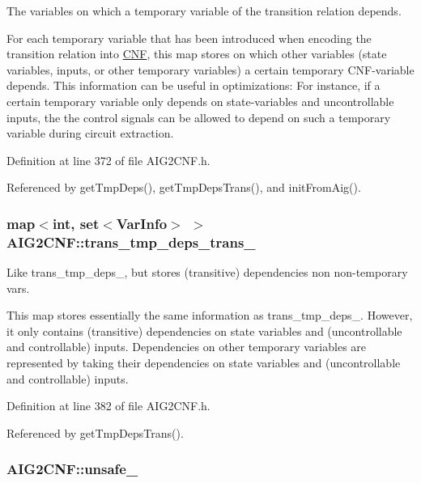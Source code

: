 The variables on which a temporary variable of the transition relation depends. 

For each temporary variable that has been introduced when encoding the transition relation into \hyperlink{classCNF}{C\-N\-F}, this map stores on which other variables (state variables, inputs, or other temporary variables) a certain temporary C\-N\-F-\/variable depends. This information can be useful in optimizations\-: For instance, if a certain temporary variable only depends on state-\/variables and uncontrollable inputs, the the control signals can be allowed to depend on such a temporary variable during circuit extraction. 

Definition at line 372 of file A\-I\-G2\-C\-N\-F.\-h.



Referenced by get\-Tmp\-Deps(), get\-Tmp\-Deps\-Trans(), and init\-From\-Aig().

\hypertarget{classAIG2CNF_a7e3c2e9acc3357e837349e30447b93c3}{
\subsubsection[{trans\-\_\-tmp\-\_\-deps\-\_\-trans\-\_\-}]{\setlength{\rightskip}{0pt plus 5cm}map$<$int, set$<${\bf Var\-Info}$>$ $>$ A\-I\-G2\-C\-N\-F\-::trans\-\_\-tmp\-\_\-deps\-\_\-trans\-\_\-\hspace{0.3cm}{\ttfamily [protected]}}}\label{classAIG2CNF_a7e3c2e9acc3357e837349e30447b93c3}


Like trans\-\_\-tmp\-\_\-deps\-\_\-, but stores (transitive) dependencies non non-\/temporary vars. 

This map stores essentially the same information as trans\-\_\-tmp\-\_\-deps\-\_\-. However, it only contains (transitive) dependencies on state variables and (uncontrollable and controllable) inputs. Dependencies on other temporary variables are represented by taking their dependencies on state variables and (uncontrollable and controllable) inputs. 

Definition at line 382 of file A\-I\-G2\-C\-N\-F.\-h.



Referenced by get\-Tmp\-Deps\-Trans().

\hypertarget{classAIG2CNF_afbfcf3a27261a2283a99362d2527d64f}{
\subsubsection[{unsafe\-\_\-}]{ A\-I\-G2\-C\-N\-F\-::unsafe\-\_\-\hspace{0.3cm}{\ttfamily [protected]}}}\label{classAIG2CNF_afbfcf3a27261a2283a99362d2527d64f}


